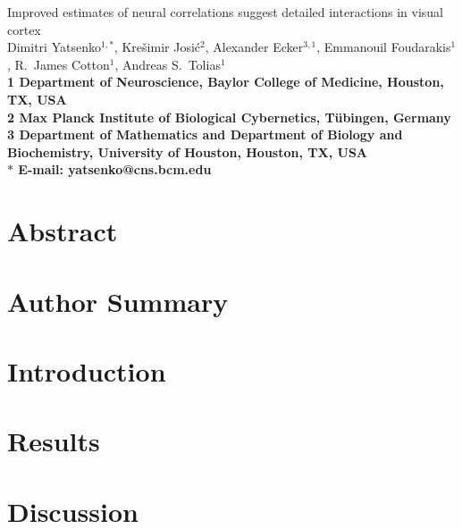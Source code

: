 \documentclass[10pt]{article}
\date{}
\begin{document}
\begin{flushleft}
{\Large
Improved estimates of neural correlations suggest detailed interactions in visual cortex
}
\\
Dimitri Yatsenko$^{1,\ast}$, 
Kre\v{s}imir Josi\'{c}$^{2}$,
Alexander Ecker$^{3,1}$,
Emmanouil Foudarakis$^{1}$,
R.~James Cotton$^{1}$,
Andreas S.~Tolias$^{1}$
\\
\bf{1} Department of Neuroscience, Baylor College of Medicine, Houston, TX, USA
\\
\bf{2} Max Planck Institute of Biological Cybernetics, T\"ubingen, Germany
\\
\bf{3} Department of Mathematics and Department of Biology and Biochemistry, University of Houston, Houston, TX, USA
\\
$\ast$ E-mail: yatsenko@cns.bcm.edu
\end{flushleft}

\section*{Abstract}


\section*{Author Summary}


\section*{Introduction}


\section*{Results}


\section*{Discussion}
%

\end{document}
